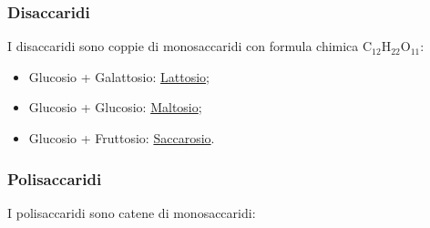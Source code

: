 \documentclass{article}
\begin{document}
\subsubsection{Disaccaridi}
I disaccaridi sono coppie di monosaccaridi con formula chimica C$_{12}$H$_{22}$O$_{11}$:
\begin{itemize}
    \item Glucosio + Galattosio: \underline{Lattosio};
    \item Glucosio + Glucosio: \underline{Maltosio};
    \item Glucosio + Fruttosio: \underline{Saccarosio}.
\end{itemize}

\subsubsection{Polisaccaridi}
I polisaccaridi sono catene di monosaccaridi:
\end{document}
